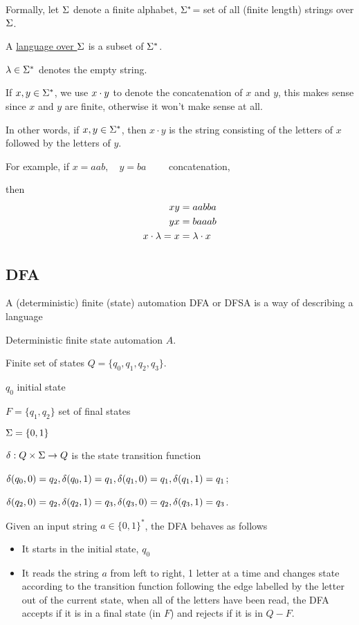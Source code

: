 \documentclass[11pt, cyan, night, 0.5in]{hw}
\begin{document}
Formally, let $\Sigma$ denote a finite alphabet, $\Sigma^*$= set of all (finite length) strings over $\Sigma$. 

A \underline{language over $\Sigma$} is a subset of $\Sigma^*$.

$\lambda\in\Sigma^*$ denotes the empty string. 

If $x,y\in\Sigma^*$, we use $x\cdot y$ to denote the concatenation of $x$ and $y$, this makes sense since $x$ and $y$ are finite, otherwise it won't make sense at all.

In other words, if $x,y\in\Sigma^*$, then $x\cdot y$ is the string consisting of the letters of $x$ followed by the letters of $y$.

For example, if $x=aab, \quad y=ba\quad\quad$ concatenation,

then \begin{align*}
    xy&=aabba\\
    yx&=baaab\\
    x\cdot \lambda = x &= \lambda\cdot x
\end{align*}

\subsection{DFA}

A (deterministic) finite (state) automation DFA or DFSA is a way of describing a language


\begin{center}
    Deterministic finite state automation $A$.
\end{center}

Finite set of states $Q=\{q_0,q_1,q_2,q_3\}$.

$q_0$ initial state 

$F=\{q_1,q_2\}$ set of final states 

$\Sigma = \{0,1\}$

$\delta:Q\times \Sigma\to Q$ is the state transition function

$\delta(q_0,0)=q_2, \delta(q_0,1)=q_1, \delta(q_1,0)=q_1, \delta(q_1,1)=q_1$;

$\delta(q_2,0)=q_2, \delta(q_2,1)=q_3, \delta(q_3,0)=q_2, \delta(q_3,1)=q_3$.


Given an input string $a\in\{0,1\}^*$, the DFA behaves as follows\begin{itemize}
    \item It starts in the initial state, $q_0$
    \item It reads the string $a$ from left to right, 1 letter at a time and changes state according to the transition function following the edge labelled by the letter out of the current state, when all of the letters have been read, the DFA accepts if it is in a final state (in $F$) and rejects if it is in $Q-F$.
\end{itemize}
\end{document}
